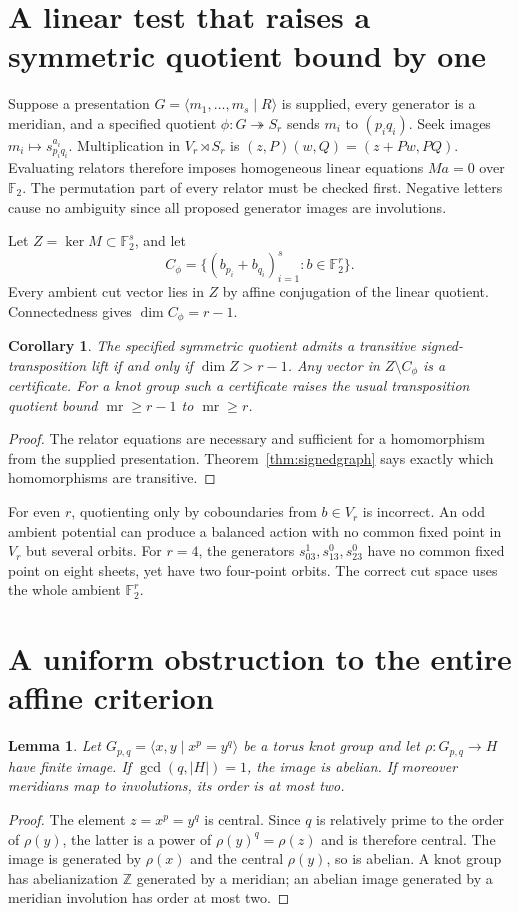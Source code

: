 \documentclass[11pt]{article}
\newtheorem{lemma}[theorem]{Lemma}
\newtheorem{corollary}[theorem]{Corollary}
\newcommand{\F}{\mathbb F}
\newcommand{\mr}{\operatorname{mr}}
\begin{document}
\section{A linear test that raises a symmetric quotient bound by one}

Suppose a presentation $G=\langle m_1,\ldots,m_s\mid R\rangle$ is supplied,
every generator is a meridian, and a specified quotient
$\phi:G\twoheadrightarrow S_r$ sends $m_i$ to $(p_iq_i)$.
Seek images $m_i\mapsto s_{p_iq_i}^{a_i}$.
Multiplication in $V_r\rtimes S_r$ is
$(z,P)(w,Q)=(z+Pw,PQ)$. Evaluating relators therefore imposes homogeneous
linear equations $Ma=0$ over $\F_2$. The permutation part of every
relator must be checked first. Negative letters cause no ambiguity since
all proposed generator images are involutions.

Let $Z=\ker M\subset\F_2^s$, and let
\[
 C_\phi=\{(b_{p_i}+b_{q_i})_{i=1}^s:b\in\F_2^r\}.
\]
Every ambient cut vector lies in $Z$ by affine conjugation of the linear
quotient. Connectedness gives $\dim C_\phi=r-1$.
\begin{corollary}\label{cor:algorithm}
The specified symmetric quotient admits a transitive signed-transposition
lift if and only if $\dim Z>r-1$. Any vector in $Z\setminus C_\phi$ is
a certificate. For a knot group such a certificate raises the usual
transposition quotient bound $\mr\ge r-1$ to $\mr\ge r$.
\end{corollary}
\begin{proof}
The relator equations are necessary and sufficient for a homomorphism
from the supplied presentation. Theorem~\ref{thm:signedgraph} says exactly
which homomorphisms are transitive.
\end{proof}

For even $r$, quotienting only by coboundaries from $b\in V_r$ is
incorrect. An odd ambient potential can produce a balanced action with
no common fixed point in $V_r$ but several orbits. For $r=4$, the
generators $s_{03}^1,s_{13}^0,s_{23}^0$ have no common fixed point on eight
sheets, yet have two four-point orbits. The correct cut space uses the
whole ambient $\F_2^r$.

\section{A uniform obstruction to the entire affine criterion}

\begin{lemma}\label{lem:torus}
Let $G_{p,q}=\langle x,y\mid x^p=y^q\rangle$ be a torus knot group and
let $\rho:G_{p,q}\to H$ have finite image. If $\gcd(q,|H|)=1$, the image
is abelian. If moreover meridians map to involutions, its order is at
most two.
\end{lemma}
\begin{proof}
The element $z=x^p=y^q$ is central. Since $q$ is relatively prime to
the order of $\rho(y)$, the latter is a power of $\rho(y)^q=\rho(z)$
and is therefore central. The image is generated by $\rho(x)$ and the
central $\rho(y)$, so is abelian. A knot group has abelianization $\mathbb Z$
generated by a meridian; an abelian image generated by a meridian
involution has order at most two.
\end{proof}
\end{document}
